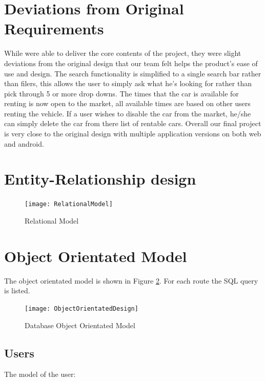 \documentclass{article}
\begin{document}
\section{Deviations from Original Requirements}
While were able to deliver the core contents of the project, they were slight deviations from the original design that
our team felt helps the product's ease of use and design. The search functionality is simplified to a single search bar rather than filers,
this allows the user to simply ask what he's looking for rather than pick through 5 or more drop downs. The times that the car is available for renting
is now open to the market, all available times are based on other users renting the vehicle. If a user wishes to disable the car from the market, he/she can
simply delete the car from there list of rentable cars. Overall our final project is very close to the original design with multiple application versions on both
web and android.

\section{Entity-Relationship design}
\begin{figure}[H]
    \centering
    \texttt{[image: RelationalModel]}
    \caption{Relational Model}
    \label{fig:relationalmodel}
\end{figure}

\section{Object Orientated Model}
The object orientated model is shown in Figure \ref{fig:oomodel}. For each
route the SQL query is listed.
\begin{figure}[ht!]
    \centering
    \texttt{[image: ObjectOrientatedDesign]}
    \caption{Database Object Orientated Model}
    \label{fig:oomodel}
\end{figure}
\subsection{Users}
The model of the user:
\end{document}
